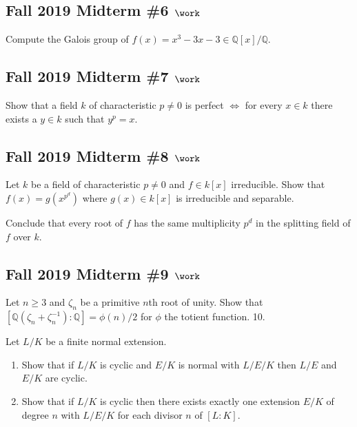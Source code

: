 \hypertarget{fall-2019-midterm-6-work}{%
\subsection{\texorpdfstring{Fall 2019 Midterm \#6
\(\work\)}{Fall 2019 Midterm \#6 \textbackslash work}}\label{fall-2019-midterm-6-work}}

Compute the Galois group of
\(f(x) = x^3-3x -3\in {\mathbb{Q}}[x]/{\mathbb{Q}}\).

\hypertarget{fall-2019-midterm-7-work}{%
\subsection{\texorpdfstring{Fall 2019 Midterm \#7
\(\work\)}{Fall 2019 Midterm \#7 \textbackslash work}}\label{fall-2019-midterm-7-work}}

Show that a field \(k\) of characteristic \(p\neq 0\) is perfect
\(\iff\) for every \(x\in k\) there exists a \(y\in k\) such that
\(y^p=x\).

\hypertarget{fall-2019-midterm-8-work}{%
\subsection{\texorpdfstring{Fall 2019 Midterm \#8
\(\work\)}{Fall 2019 Midterm \#8 \textbackslash work}}\label{fall-2019-midterm-8-work}}

Let \(k\) be a field of characteristic \(p\neq 0\) and \(f\in k[x]\)
irreducible. Show that \(f(x) = g(x^{p^d})\) where \(g(x) \in k[x]\) is
irreducible and separable.

Conclude that every root of \(f\) has the same multiplicity \(p^d\) in
the splitting field of \(f\) over \(k\).

\hypertarget{fall-2019-midterm-9-work}{%
\subsection{\texorpdfstring{Fall 2019 Midterm \#9
\(\work\)}{Fall 2019 Midterm \#9 \textbackslash work}}\label{fall-2019-midterm-9-work}}

Let \(n\geq 3\) and \(\zeta_n\) be a primitive \(n\)th root of unity.
Show that
\([{\mathbb{Q}}(\zeta_n + \zeta_n^{-1}): {\mathbb{Q}}] = \phi(n)/2\) for
\(\phi\) the totient function. 10.

Let \(L/K\) be a finite normal extension.

\begin{enumerate}
\def\labelenumi{\alph{enumi}.}
\item
  Show that if \(L/K\) is cyclic and \(E/K\) is normal with \(L/E/K\)
  then \(L/E\) and \(E/K\) are cyclic.
\item
  Show that if \(L/K\) is cyclic then there exists exactly one extension
  \(E/K\) of degree \(n\) with \(L/E/K\) for each divisor \(n\) of
  \([L:K]\).
\end{enumerate}

